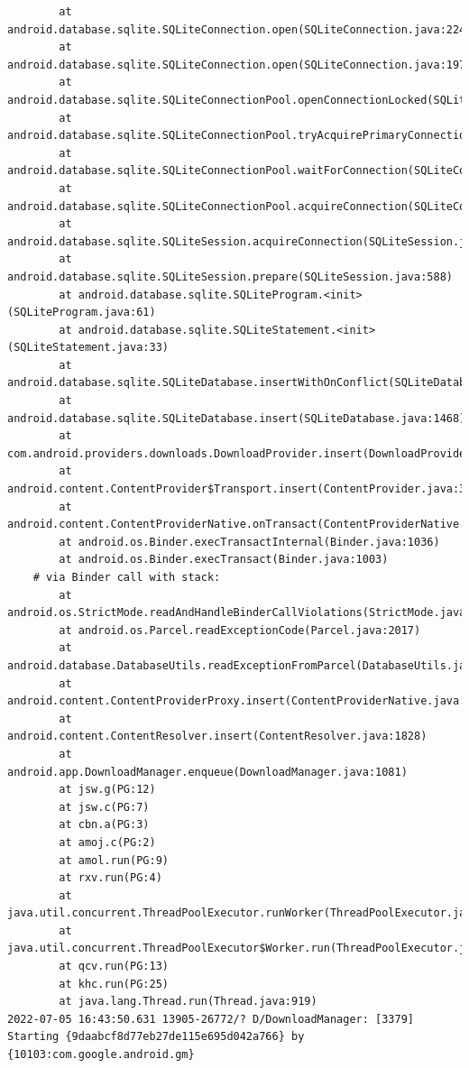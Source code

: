 \documentclass[a4paper,12pt]{book}
\begin{document}
\begin{lstlisting}
        at android.database.sqlite.SQLiteConnection.open(SQLiteConnection.java:224)
        at android.database.sqlite.SQLiteConnection.open(SQLiteConnection.java:197)
        at android.database.sqlite.SQLiteConnectionPool.openConnectionLocked(SQLiteConnectionPool.java:505)
        at android.database.sqlite.SQLiteConnectionPool.tryAcquirePrimaryConnectionLocked(SQLiteConnectionPool.java:949)
        at android.database.sqlite.SQLiteConnectionPool.waitForConnection(SQLiteConnectionPool.java:699)
        at android.database.sqlite.SQLiteConnectionPool.acquireConnection(SQLiteConnectionPool.java:380)
        at android.database.sqlite.SQLiteSession.acquireConnection(SQLiteSession.java:896)
        at android.database.sqlite.SQLiteSession.prepare(SQLiteSession.java:588)
        at android.database.sqlite.SQLiteProgram.<init>(SQLiteProgram.java:61)
        at android.database.sqlite.SQLiteStatement.<init>(SQLiteStatement.java:33)
        at android.database.sqlite.SQLiteDatabase.insertWithOnConflict(SQLiteDatabase.java:1597)
        at android.database.sqlite.SQLiteDatabase.insert(SQLiteDatabase.java:1468)
        at com.android.providers.downloads.DownloadProvider.insert(DownloadProvider.java:972)
        at android.content.ContentProvider$Transport.insert(ContentProvider.java:309)
        at android.content.ContentProviderNative.onTransact(ContentProviderNative.java:154)
        at android.os.Binder.execTransactInternal(Binder.java:1036)
        at android.os.Binder.execTransact(Binder.java:1003)
    # via Binder call with stack:
        at android.os.StrictMode.readAndHandleBinderCallViolations(StrictMode.java:2289)
        at android.os.Parcel.readExceptionCode(Parcel.java:2017)
        at android.database.DatabaseUtils.readExceptionFromParcel(DatabaseUtils.java:137)
        at android.content.ContentProviderProxy.insert(ContentProviderNative.java:481)
        at android.content.ContentResolver.insert(ContentResolver.java:1828)
        at android.app.DownloadManager.enqueue(DownloadManager.java:1081)
        at jsw.g(PG:12)
        at jsw.c(PG:7)
        at cbn.a(PG:3)
        at amoj.c(PG:2)
        at amol.run(PG:9)
        at rxv.run(PG:4)
        at java.util.concurrent.ThreadPoolExecutor.runWorker(ThreadPoolExecutor.java:1167)
        at java.util.concurrent.ThreadPoolExecutor$Worker.run(ThreadPoolExecutor.java:641)
        at qcv.run(PG:13)
        at khc.run(PG:25)
        at java.lang.Thread.run(Thread.java:919)
2022-07-05 16:43:50.631 13905-26772/? D/DownloadManager: [3379] Starting {9daabcf8d77eb27de115e695d042a766} by {10103:com.google.android.gm}

\end{lstlisting}
\end{document}

